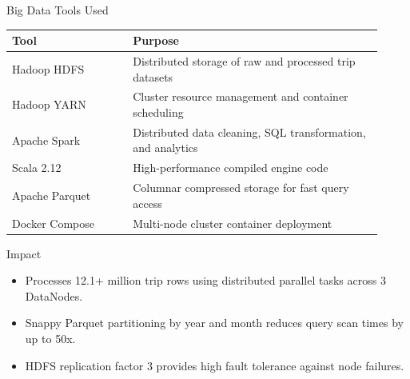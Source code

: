 \documentclass[aspectratio=169]{beamer}
\begin{document}
\begin{frame}{Big Data Tools Used}
  \small
  \begin{tabular}{p{0.30\linewidth} p{0.62\linewidth}}
    \toprule
    \textbf{Tool} & \textbf{Purpose} \\
    \midrule
    Hadoop HDFS & Distributed storage of raw and processed trip datasets \\
    Hadoop YARN & Cluster resource management and container scheduling \\
    Apache Spark & Distributed data cleaning, SQL transformation, and analytics \\
    Scala 2.12 & High-performance compiled engine code \\
    Apache Parquet & Columnar compressed storage for fast query access \\
    Docker Compose & Multi-node cluster container deployment \\
    \bottomrule
  \end{tabular}
  \vspace{4pt}
  \begin{block}{Impact}
    \begin{itemize}
      \item Processes 12.1+ million trip rows using distributed parallel tasks across 3 DataNodes.
      \item Snappy Parquet partitioning by year and month reduces query scan times by up to 50x.
      \item HDFS replication factor 3 provides high fault tolerance against node failures.
    \end{itemize}
  \end{block}
\end{frame}
\end{document}
